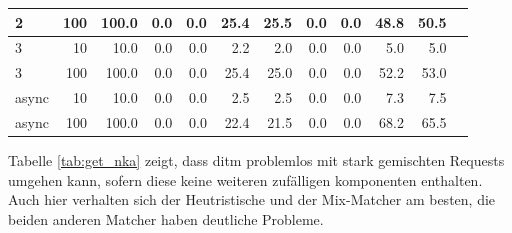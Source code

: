 \documentclass[12pt,a4paper]{report}
\begin{document}
\begin{table}[H]
\begin{tabular}{|l|r|r|r|r|r|r|r|r|r|r|r|}
		2                        & 100                            & 100.0                          & 0.0                           & 0.0                           & 25.4                            & 25.5 & 0.0 & 0.0 & 48.8 & 50.5 \\ \hline
		3                        & 10                             & 10.0                           & 0.0                           & 0.0                           & 2.2                             & 2.0  & 0.0 & 0.0 & 5.0  & 5.0  \\ \hline
		3                        & 100                            & 100.0                          & 0.0                           & 0.0                           & 25.4                            & 25.0 & 0.0 & 0.0 & 52.2 & 53.0 \\ \hline
		async                    & 10                             & 10.0                           & 0.0                           & 0.0                           & 2.5                             & 2.5  & 0.0 & 0.0 & 7.3  & 7.5  \\ \hline
		async                    & 100                            & 100.0                          & 0.0                           & 0.0                           & 22.4                            & 21.5 & 0.0 & 0.0 & 68.2 & 65.5 \\ \hline
	\end{tabular}
\end{table}

Tabelle \ref{tab:get_nka} zeigt, dass ditm problemlos mit stark gemischten Requests umgehen kann, sofern diese keine weiteren zufälligen
komponenten enthalten. Auch hier verhalten sich der Heutristische und der Mix-Matcher am besten, die beiden anderen
Matcher haben deutliche Probleme.
\end{document}
